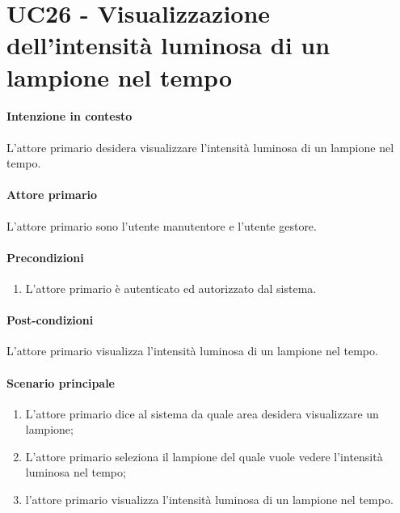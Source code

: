 \section{UC26 - Visualizzazione dell'intensità luminosa di un lampione nel tempo}\label{uc:26}
\paragraph{Intenzione in contesto} L'attore primario desidera visualizzare l'intensità luminosa di un lampione nel tempo.
\paragraph{Attore primario} L'attore primario sono l'utente manutentore e l'utente gestore.
\paragraph{Precondizioni}  
\begin{enumerate}
    \item L'attore primario è autenticato ed autorizzato dal sistema.
\end{enumerate}
\paragraph{Post-condizioni} L'attore primario visualizza l'intensità luminosa di un lampione nel tempo.
\paragraph{Scenario principale}
\begin{enumerate}
    \item L'attore primario dice al sistema da quale area desidera visualizzare un lampione;
    \item L'attore primario seleziona il lampione del quale vuole vedere l'intensità luminosa nel tempo;
    \item l'attore primario visualizza l'intensità luminosa di un lampione nel tempo.
\end{enumerate}